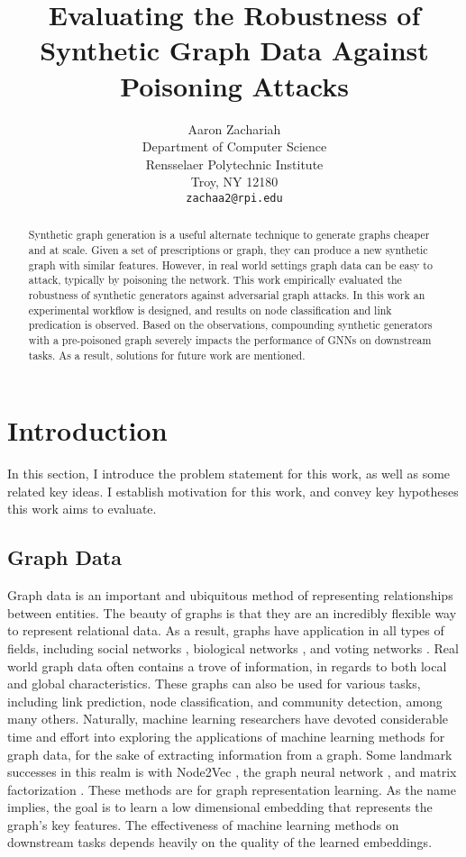 \documentclass{article}
\title{Evaluating the Robustness of Synthetic Graph Data Against Poisoning Attacks}
\author{
  Aaron Zachariah \\
  Department of Computer Science\\
  Rensselaer Polytechnic Institute\\
  Troy, NY 12180 \\
  \texttt{zachaa2@rpi.edu} \\
}
\begin{document}
\maketitle


\begin{abstract}
  Synthetic graph generation is a useful alternate technique to generate graphs cheaper and at scale. Given a set of prescriptions or graph, they can produce a new synthetic graph with similar features. However, in real world settings graph data can be easy to attack, typically by poisoning the network. This work empirically evaluated the robustness of synthetic generators against adversarial graph attacks. In this work an experimental workflow is designed, and results on node classification and link predication is observed. Based on the observations, compounding synthetic generators with a pre-poisoned graph severely impacts the performance of GNNs on downstream tasks. As a result, solutions for future work are mentioned.
\end{abstract}


\section{Introduction}
\label{Intro}

In this section, I introduce the problem statement for this work, as well as some related key ideas. I establish motivation for this work, and convey key hypotheses this work aims to evaluate. 

\subsection{Graph Data}

Graph data is an important and ubiquitous method of representing relationships between entities. The beauty of graphs is that they are an incredibly flexible way to represent relational data. As a result, graphs have application in all types of fields, including social networks \cite{socialnetworks}, biological networks \cite{Girvan_2002}, and voting networks \cite{votingnetworks}. Real world graph data often contains a trove of information, in regards to both local and global characteristics. These graphs can also be used for various tasks, including link prediction, node classification, and community detection, among many others. Naturally, machine learning researchers have devoted considerable time and effort into exploring the applications of machine learning methods for graph data, for the sake of extracting information from a graph. Some landmark successes in this realm is with Node2Vec \cite{grover2016node2vec}, the graph neural network \cite{GNNModel}, and matrix factorization \cite{matrixfactor}. These methods are for graph representation learning. As the name implies, the goal is to learn a low dimensional embedding that represents the graph's key features. The effectiveness of machine learning methods on downstream tasks depends heavily on the quality of the learned embeddings. 
\end{document}
